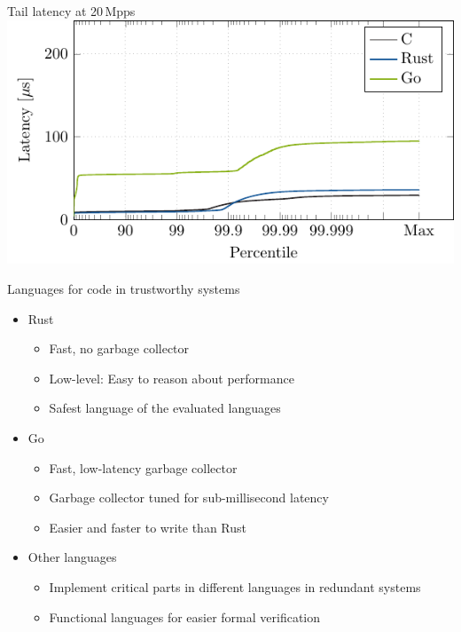 \documentclass[NET,english,aspectratio=169,notitleframe]{tumbeamer}
\begin{document}
\begin{frame}{Tail latency at 20\,Mpps}
\centering\includegraphics[scale=1.1]{figures/latency-20/latency-ccdf.pdf}
\end{frame}


\begin{frame}{Languages for code in trustworthy systems}
\begin{itemize}
\item Rust
\begin{itemize}
\item Fast, no garbage collector
\item Low-level: Easy to reason about performance
\item Safest language of the evaluated languages
\end{itemize}
\item Go
\begin{itemize}
\item Fast, low-latency garbage collector
\item Garbage collector tuned for sub-millisecond latency
\item Easier and faster to write than Rust
\end{itemize}
\pause
\item Other languages
\begin{itemize}
\item Implement critical parts in different languages in redundant systems
\item Functional languages for easier formal verification
\end{itemize}
\end{itemize}
\end{frame}
\end{document}
